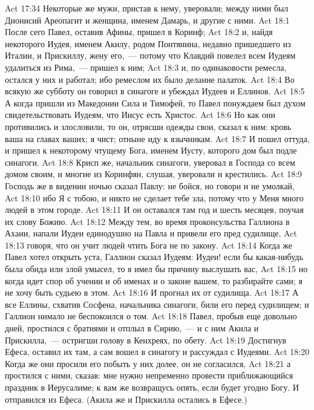 \vs Act 17:34 Некоторые же мужи, пристав к нему, уверовали; между ними был Дионисий Ареопагит и женщина, именем Дамарь, и другие с ними.
\vs Act 18:1 После сего Павел, оставив Афины, пришел в Коринф;
\vs Act 18:2 и, найдя некоторого Иудея, именем Акилу, родом Понтянина, недавно пришедшего из Италии, и Прискиллу, жену его,~--- потому что Клавдий повелел всем Иудеям удалиться из Рима,~--- пришел к ним;
\vs Act 18:3 и, по одинаковости ремесла, остался у них и работал; ибо ремеслом их было делание палаток.
\vs Act 18:4 Во всякую же субботу он говорил в синагоге и убеждал Иудеев и Еллинов.
\rsbpar\vs Act 18:5 А когда пришли из Македонии Сила и Тимофей, то Павел понуждаем был духом свидетельствовать Иудеям, что Иисус есть Христос.
\vs Act 18:6 Но как они противились и злословили, то он, отрясши одежды свои, сказал к ним: кровь ваша на главах ваших; я чист; отныне иду к язычникам.
\vs Act 18:7 И пошел оттуда, и пришел к некоторому чтущему Бога, именем Иусту, которого дом был подле синагоги.
\vs Act 18:8 Крисп же, начальник синагоги, уверовал в Господа со всем домом своим, и многие из Коринфян, слушая, уверовали и крестились.
\vs Act 18:9 Господь же в видении ночью сказал Павлу: не бойся, но говори и не умолкай,
\vs Act 18:10 ибо Я с тобою, и никто не сделает тебе зла, потому что у Меня много людей в этом городе.
\vs Act 18:11 И он оставался там год и шесть месяцев, поучая их слову Божию.
\rsbpar\vs Act 18:12 Между тем, во время проконсульства Галлиона в Ахаии, напали Иудеи единодушно на Павла и привели его пред судилище,
\vs Act 18:13 говоря, что он учит людей чтить Бога не по закону.
\vs Act 18:14 Когда же Павел хотел открыть уста, Галлион сказал Иудеям: Иудеи! если бы какая-нибудь была обида или злой умысел, то я имел бы причину выслушать вас,
\vs Act 18:15 но когда идет спор об учении и об именах и о законе вашем, то разбирайте сами; я не хочу быть судьею в этом.
\vs Act 18:16 И прогнал их от судилища.
\vs Act 18:17 А все Еллины, схватив Сосфена, начальника синагоги, били его перед судилищем; и Галлион нимало не беспокоился о том.
\rsbpar\vs Act 18:18 Павел, пробыв еще довольно дней, простился с братиями и отплыл в Сирию,~--- и с ним Акила и Прискилла,~--- остригши голову в Кенхреях, по обету.
\vs Act 18:19 Достигнув Ефеса, оставил их там, а сам вошел в синагогу и рассуждал с Иудеями.
\vs Act 18:20 Когда же они просили его побыть у них долее, он не согласился,
\vs Act 18:21 а простился с ними, сказав: мне нужно непременно провести приближающийся праздник в Иерусалиме; к вам же возвращусь опять, если будет угодно Богу. И отправился из Ефеса. (Акила же и Прискилла остались в Ефесе.)
